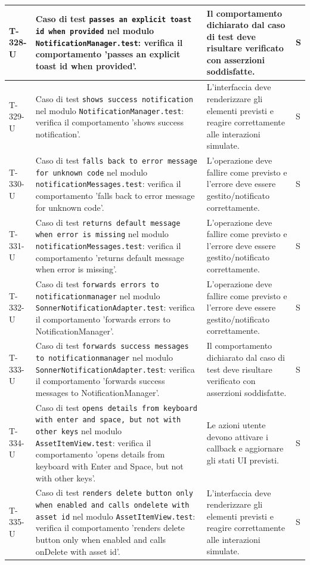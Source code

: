 \documentclass[a4paper,12pt]{article}
\begin{document}
{{\begin{longtable}{|>{\RaggedRight\arraybackslash}p{1.55cm}|>{\RaggedRight\arraybackslash}p{8.0cm}|>{\RaggedRight\arraybackslash}p{4.6cm}|>{\RaggedRight\arraybackslash}p{1.2cm}|}
        \hline
        T-328-U & Caso di test \texttt{passes an explicit toast id when provided} nel modulo \texttt{NotificationManager.test}: verifica il comportamento 'passes an explicit toast id when provided'. & Il comportamento dichiarato dal caso di test deve risultare verificato con asserzioni soddisfatte. & S \\
        \hline
        T-329-U & Caso di test \texttt{shows success notification} nel modulo \texttt{NotificationManager.test}: verifica il comportamento 'shows success notification'. & L'interfaccia deve renderizzare gli elementi previsti e reagire correttamente alle interazioni simulate. & S \\
        \hline
        T-330-U & Caso di test \texttt{falls back to error message for unknown code} nel modulo \texttt{notificationMessages.test}: verifica il comportamento 'falls back to error message for unknown code'. & L'operazione deve fallire come previsto e l'errore deve essere gestito/notificato correttamente. & S \\
        \hline
        T-331-U & Caso di test \texttt{returns default message when error is missing} nel modulo \texttt{notificationMessages.test}: verifica il comportamento 'returns default message when error is missing'. & L'operazione deve fallire come previsto e l'errore deve essere gestito/notificato correttamente. & S \\
        \hline
        T-332-U & Caso di test \texttt{forwards errors to notificationmanager} nel modulo \texttt{SonnerNotificationAdapter.test}: verifica il comportamento 'forwards errors to NotificationManager'. & L'operazione deve fallire come previsto e l'errore deve essere gestito/notificato correttamente. & S \\
        \hline
        T-333-U & Caso di test \texttt{forwards success messages to notificationmanager} nel modulo \texttt{SonnerNotificationAdapter.test}: verifica il comportamento 'forwards success messages to NotificationManager'. & Il comportamento dichiarato dal caso di test deve risultare verificato con asserzioni soddisfatte. & S \\
        \hline
        T-334-U & Caso di test \texttt{opens details from keyboard with enter and space, but not with other keys} nel modulo \texttt{AssetItemView.test}: verifica il comportamento 'opens details from keyboard with Enter and Space, but not with other keys'. & Le azioni utente devono attivare i callback e aggiornare gli stati UI previsti. & S \\
        \hline
        T-335-U & Caso di test \texttt{renders delete button only when enabled and calls ondelete with asset id} nel modulo \texttt{AssetItemView.test}: verifica il comportamento 'renders delete button only when enabled and calls onDelete with asset id'. & L'interfaccia deve renderizzare gli elementi previsti e reagire correttamente alle interazioni simulate. & S \\

\end{longtable}}}
\end{document}
